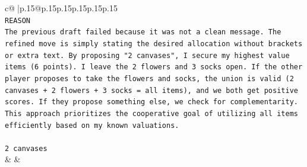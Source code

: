 \documentclass{article}
\begin{document}
{\begin{supertabular}{c@{$\;$}|p{.15\linewidth}@{}p{.15\linewidth}p{.15\linewidth}p{.15\linewidth}p{.15\linewidth}p{.15\linewidth}}
{{{\\ 
\texttt{REASON} \\
\texttt{The previous draft failed because it was not a clean message. The refined move is simply stating the desired allocation without brackets or extra text. By proposing "2 canvases", I secure my highest value items (6 points). I leave the 2 flowers and 3 socks open. If the other player proposes to take the flowers and socks, the union is valid (2 canvases + 2 flowers + 3 socks = all items), and we both get positive scores. If they propose something else, we check for complementarity. This approach prioritizes the cooperative goal of utilizing all items efficiently based on my known valuations.} \\
\\ 
\texttt{2 canvases} \\
            }
        }
    }
    & & \\ \\


\end{supertabular}}
\end{document}

